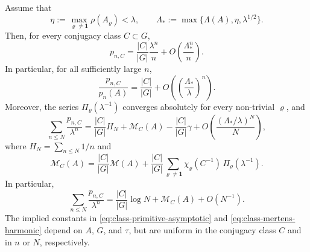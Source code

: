 \begin{theorem}
  \label{thm:class-mertens-explicit}
  Assume that
  \[
    \eta:=\max_{\varrho\neq\mathbf 1}\rho(A_\varrho)<\lambda,
    \qquad
    \Lambda_*:=\max\{\Lambda(A),\eta,\lambda^{1/2}\}.
  \]
  Then, for every conjugacy class \(C\subset G\),
  \begin{equation}\label{eq:class-primitive-asymptotic}
    p_{n,C}
    =
    \frac{|C|}{|G|}\frac{\lambda^n}{n}
    +O\!\left(\frac{\Lambda_*^n}{n}\right).
  \end{equation}
  In particular, for all sufficiently large \(n\),
  \begin{equation}\label{eq:class-chebotarev-density}
    \frac{p_{n,C}}{p_n(A)}
    =
    \frac{|C|}{|G|}
    +O\!\left(\left(\frac{\Lambda_*}{\lambda}\right)^n\right).
  \end{equation}
  Moreover, the series \(\Pi_\varrho(\lambda^{-1})\) converges
  absolutely for every non-trivial \(\varrho\), and
  \begin{equation}\label{eq:class-mertens-harmonic}
    \sum_{n\le N}\frac{p_{n,C}}{\lambda^n}
    =
    \frac{|C|}{|G|}H_N
    +\mathcal M_C(A)-\frac{|C|}{|G|}\gamma
    +O\!\left(\frac{(\Lambda_*/\lambda)^N}{N}\right),
  \end{equation}
  where \(H_N=\sum_{n\le N}1/n\) and
  \begin{equation}\label{eq:class-mertens-constant}
    \mathcal M_C(A)
    =
    \frac{|C|}{|G|}\mathcal M(A)
    +\frac{|C|}{|G|}
      \sum_{\varrho\neq\mathbf 1}
        \chi_\varrho(C^{-1})\,\Pi_\varrho(\lambda^{-1}).
  \end{equation}
  In particular,
  \begin{equation}\label{eq:class-mertens-log}
    \sum_{n\le N}\frac{p_{n,C}}{\lambda^n}
    =
    \frac{|C|}{|G|}\log N+\mathcal M_C(A)+O(N^{-1}).
  \end{equation}
  The implied constants in
  \eqref{eq:class-primitive-asymptotic} and
  \eqref{eq:class-mertens-harmonic} depend on \(A\), \(G\), and
  \(\tau\), but are uniform in the conjugacy class \(C\) and in \(n\)
  or \(N\), respectively.
\end{theorem}

